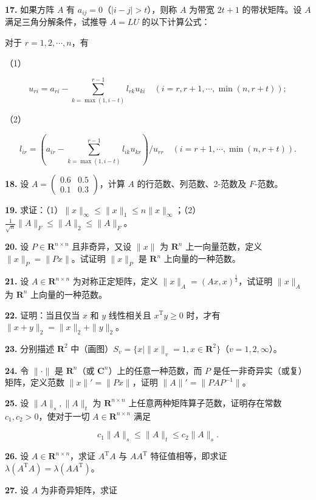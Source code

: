 \textbf{17.} 如果方阵 \(A\) 有 \(a_{ij}=0\)（\(|i-j|>t\)），则称 \(A\) 为带宽 \(2t+1\) 的带状矩阵。设 \(A\) 满足三角分解条件，试推导 \(A=LU\) 的以下计算公式：

对于 \(r=1,2,\cdots,n\)，有

（1）

\[
u_{ri}=a_{ri}-\sum_{k=\max(1,i-t)}^{r-1}l_{rk}u_{ki}\quad(i=r,r+1,\cdots,\min(n,r+t));
\]

（2）

\[
l_{ir}=\left(a_{ir}-\sum_{k=\max(1,i-t)}^{r-1}l_{ik}u_{kr}\right)/u_{rr}\quad(i=r+1,\cdots,\min(n,r+t)).
\]

\textbf{18.} 设 \(A=\begin{pmatrix}0.6&0.5\\0.1&0.3\end{pmatrix}\)，计算 \(A\) 的行范数、列范数、2-范数及 \(F\)-范数。

\textbf{19.} 求证：（1）\(\|x\|_\infty\leqslant\|x\|_1\leqslant n\|x\|_\infty\)；（2）\(\frac1{\sqrt n}\|A\|_F\leqslant\|A\|_2\leqslant\|A\|_F\)。

\textbf{20.} 设 \(P\in\mathbf R^{n\times n}\) 且非奇异，又设 \(\|x\|\) 为 \(\mathbf R^n\) 上一向量范数，定义 \(\|x\|_P=\|Px\|\)。试证明 \(\|x\|_P\) 是 \(\mathbf R^n\) 上向量的一种范数。

\textbf{21.} 设 \(A\in\mathbf R^{n\times n}\) 为对称正定矩阵，定义 \(\|x\|_A=(Ax,x)^{\frac12}\)，试证明 \(\|x\|_A\) 为 \(\mathbf R^n\) 上向量的一种范数。

\textbf{22.} 证明：当且仅当 \(x\) 和 \(y\) 线性相关且 \(x^{\mathrm T}y\geqslant0\) 时，才有 \(\|x+y\|_2=\|x\|_2+\|y\|_2\)。

\textbf{23.} 分别描述 \(\mathbf R^2\) 中（画图）\(S_v=\{x\mid\|x\|_v=1,x\in\mathbf R^2\}\)（\(v=1,2,\infty\)）。

\textbf{24.} 令 \(\|\cdot\|\) 是 \(\mathbf R^n\)（或 \(\mathbf C^n\)）上的任意一种范数，而 \(P\) 是任一非奇异实（或复）矩阵，定义范数 \(\|x\|'=\|Px\|\)，证明 \(\|A\|'=\|PAP^{-1}\|\)。

\textbf{25.} 设 \(\|A\|_s,\|A\|_t\) 为 \(\mathbf R^{n\times n}\) 上任意两种矩阵算子范数，证明存在常数 \(c_1,c_2>0\)，使对于一切 \(A\in\mathbf R^{n\times n}\) 满足

\[
c_1\|A\|_s\leqslant\|A\|_t\leqslant c_2\|A\|_s.
\]

\textbf{26.} 设 \(A\in\mathbf R^{n\times n}\)，求证 \(A^{\mathrm T}A\) 与 \(AA^{\mathrm T}\) 特征值相等，即求证 \(\lambda(A^{\mathrm T}A)=\lambda(AA^{\mathrm T})\)。

\textbf{27.} 设 \(A\) 为非奇异矩阵，求证

